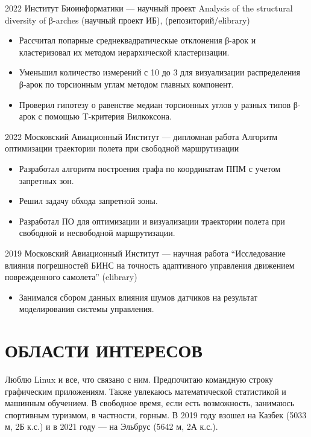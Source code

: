 \documentclass[9pt]{article}
\begin{document}
    \project
    {2022}
    {Институт Биоинформатики — научный проект}
    {Analysis of the structural diversity of β-arches (научный проект ИБ), (репозиторий/elibrary)}
    {
        \begin{itemize}
            \setlength\itemsep{-.5em}
            \item Рассчитал попарные среднеквадратическые отклонения β-арок и кластеризовал их методом иерархической кластеризации.
            \item Уменьшил количество измерений с 10 до 3 для визуализации распределения β-арок по торсионным углам методом главных компонент.
            \item Проверил гипотезу о равенстве медиан торсионных углов у разных типов β-арок с помощью T-критерия Вилкоксона.
        \end{itemize}
    }
    
    \project
    {2022}
    {Московский Авиационный Институт — дипломная работа}
    {Алгоритм оптимизации траектории полета при свободной маршрутизации}
    {
        \begin{itemize}
            \setlength\itemsep{-.5em}
            \item Разработал алгоритм построения графа по координатам ППМ с учетом запретных зон.
            \item Решил задачу обхода запретной зоны.
            \item Разработал ПО для оптимизации и визуализации траектории полета при свободной и несвободной маршрутизации.
        \end{itemize}
    }
    
    \project
    {2019}
    {Московский Авиационный Институт — научная работа}
    {“Исследование влияния погрешностей БИНС на точность адаптивного управления движением поврежденного самолета” (elibrary)}
    {
        \begin{itemize}
            \setlength\itemsep{-.5em}
            \item Занимался сбором данных влияния шумов датчиков на результат моделирования системы управления.
        \end{itemize}
    }


\section{ОБЛАСТИ ИНТЕРЕСОВ}

    Люблю Linux и все, что связано с ним. Предпочитаю командную строку графическим приложениям.
    Также увлекаюсь математической статистикой и машинным обучением.
    В свободное время, если есть возможность, занимаюсь спортивным туризмом, в частности, горным. В 2019 году
    взошел на Казбек (5033 м, 2Б к.с.) и в 2021 году — на Эльбрус (5642 м, 2А к.с.).
\end{document}
